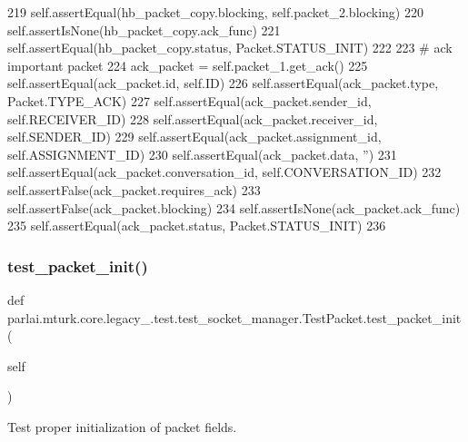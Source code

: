 \begin{DoxyCode}
219         self.assertEqual(hb\_packet\_copy.blocking, self.packet\_2.blocking)
220         self.assertIsNone(hb\_packet\_copy.ack\_func)
221         self.assertEqual(hb\_packet\_copy.status, Packet.STATUS\_INIT)
222 
223         \textcolor{comment}{# ack important packet}
224         ack\_packet = self.packet\_1.get\_ack()
225         self.assertEqual(ack\_packet.id, self.ID)
226         self.assertEqual(ack\_packet.type, Packet.TYPE\_ACK)
227         self.assertEqual(ack\_packet.sender\_id, self.RECEIVER\_ID)
228         self.assertEqual(ack\_packet.receiver\_id, self.SENDER\_ID)
229         self.assertEqual(ack\_packet.assignment\_id, self.ASSIGNMENT\_ID)
230         self.assertEqual(ack\_packet.data, \textcolor{stringliteral}{''})
231         self.assertEqual(ack\_packet.conversation\_id, self.CONVERSATION\_ID)
232         self.assertFalse(ack\_packet.requires\_ack)
233         self.assertFalse(ack\_packet.blocking)
234         self.assertIsNone(ack\_packet.ack\_func)
235         self.assertEqual(ack\_packet.status, Packet.STATUS\_INIT)
236 
\end{DoxyCode}
\mbox{\label{classparlai_1_1mturk_1_1core_1_1legacy__2018_1_1test_1_1test__socket__manager_1_1TestPacket_ad9695218e4d54305abd21e8666457d9b}} 
\subsubsection{\texorpdfstring{test\+\_\+packet\+\_\+init()}{test\_packet\_init()}}
{\footnotesize\ttfamily def parlai.\+mturk.\+core.\+legacy\+\_.\+test.\+test\+\_\+socket\+\_\+manager.\+Test\+Packet.\+test\+\_\+packet\+\_\+init (\begin{DoxyParamCaption}\item[{}]{self }\end{DoxyParamCaption})}

\begin{DoxyVerb}Test proper initialization of packet fields.
\end{DoxyVerb}
 

